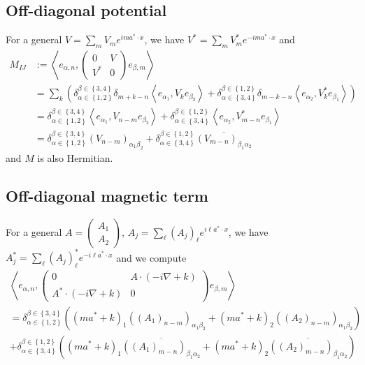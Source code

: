 \documentclass[11pt,a4paper,reqno,french,tikz]{amsart}
\newcommand{\pa}[1]{\left( #1 \right)} %
\newcommand{\acs}[1]{\left\{ #1 \right\}} %
\newcommand{\ps}[1]{\left< #1 \right>} %
\newcommand{\na}{\nabla} %
\newcommand{\mat}[1]{\begin{pmatrix} #1 \end{pmatrix}} %
\begin{document}
\subsection{Off-diagonal potential}%
\label{sub:off_diagonal_potential}



For a general $V = \sum_m V_m e^{im a^* \cdot x}$, we have $V^* = \sum_m V_m^* e^{-im a^* \cdot x}$ and
\begin{align*}
	M_{IJ} & := \ps{e_{\alpha,n}, \mat{0 & V \\ V^* & 0} e_{\beta,m}} \\
	       &= \sum_{k} \pa{\delta_{\alpha \in \acs{1,2}}^{\beta \in \acs{3,4}} \delta_{m+k-n} \ps{e_{\alpha_1},V_k e_{\beta_2}} + \delta_{\alpha \in \acs{3,4}}^{\beta \in \acs{1,2}}\delta_{m-k-n} \ps{e_{\alpha_2},V_k^* e_{\beta_1}}} \\
	       &=   \delta_{\alpha \in \acs{1,2}}^{\beta \in \acs{3,4}}\ps{e_{\alpha_1},V_{n-m} e_{\beta_2}} + \delta_{\alpha \in \acs{3,4}}^{\beta \in \acs{1,2}}\ps{e_{\alpha_2},V_{m-n}^* e_{\beta_1}} \\
	       &=     \delta_{\alpha \in \acs{1,2}}^{\beta \in \acs{3,4}}\pa{V_{n-m}}_{\alpha_1 \beta_2} + \delta_{\alpha \in \acs{3,4}}^{\beta \in \acs{1,2}} \overline{\pa{V_{m-n}}_{\beta_1\alpha_2} }
\end{align*}
and $M$ is also Hermitian.

\subsection{Off-diagonal magnetic term}%
\label{sub:off_diagonal_magnetic_term}



For a general $A = \mat{A_1 \\ A_2}$, $A_j = \sum_\ell  \pa{A_j}_\ell  e^{i\ell a^*\cdot x}$, we have $A_j^* = \sum_\ell  \pa{A_j}^*_\ell  e^{-i\ell a^*\cdot x}$ and we compute
\begin{multline*}
\ps{e_{\alpha,n}, \mat{0 & A \cdot \pa{-i\na +k} \\A^* \cdot \pa{-i\na +k}  & 0} e_{\beta,m}} \\
= \delta_{\alpha \in \acs{1,2}}^{\beta \in \acs{3,4}} \pa{ \pa{ma^* +k}_1 \pa{\pa{A_1}_{n-m}}_{\alpha_1 \beta_2} + \pa{ma^* +k}_2 \pa{\pa{A_2}_{n-m}}_{\alpha_1 \beta_2}}\\
+ \delta_{\alpha \in \acs{3,4}}^{\beta \in \acs{1,2}} \pa{ \pa{ma^* +k}_1 \overline{\pa{\pa{A_1}_{m-n}}_{\beta_1 \alpha_2}} + \pa{ma^* +k}_2 \overline{\pa{\pa{A_2}_{m-n}}_{\beta_1 \alpha_2}}}
\end{multline*}
\end{document}
